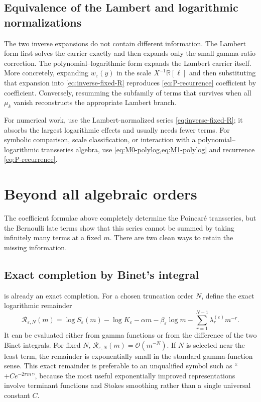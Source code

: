 \documentclass[11pt,a4paper]{article}
\theoremstyle{clean}
\theoremstyle{definition}
\newcommand{\eps}{\varepsilon}
\newcommand{\al}{\alpha}
\newcommand{\be}{\beta}
\newcommand{\OO}{\mathcal O}
\newcommand{\R}{\mathbb R}
\begin{document}
\subsection{Equivalence of the Lambert and logarithmic normalizations}

The two inverse expansions do not contain different information.  The Lambert form first solves the carrier exactly and then expands only the small gamma-ratio correction.  The polynomial--logarithmic form expands the Lambert carrier itself.  More concretely, expanding \(w_\eps(y)\) in the scale \(X^{-1}\R[\ell]\) and then substituting that expansion into \cref{eq:inverse-fixed-R} reproduces \cref{eq:P-recurrence} coefficient by coefficient.  Conversely, resumming the subfamily of terms that survives when all \(\mu_k\) vanish reconstructs the appropriate Lambert branch.

\begin{summarybox}
For numerical work, use the Lambert-normalized series \cref{eq:inverse-fixed-R}; it absorbs the largest logarithmic effects and usually needs fewer terms.  For symbolic comparison, scale classification, or interaction with a polynomial--logarithmic transseries algebra, use \cref{eq:M0-polylog,eq:M1-polylog} and recurrence \cref{eq:P-recurrence}.
\end{summarybox}

\section{Beyond all algebraic orders}
\label{sec:beyond}

The coefficient formulae above completely determine the Poincar\'e transseries, but the Bernoulli late terms show that this series cannot be summed by taking infinitely many terms at a fixed \(m\).  There are two clean ways to retain the missing information.

\subsection{Exact completion by Binet's integral}

 is already an exact completion.  For a chosen truncation order \(N\), define the exact logarithmic remainder
\begin{equation}
 \mathcal R_{\eps,N}(m)=
 \log S_\eps(m)-\log K_\eps-\al m-\be_\eps\log m
 -\sum_{r=1}^{N-1}\lambda_r^{(\eps)}m^{-r}.
 \label{eq:exact-remainder}
\end{equation}
It can be evaluated either from gamma functions or from the difference of the two Binet integrals.  For fixed \(N\), \(\mathcal R_{\eps,N}(m)=\OO(m^{-N})\).  If \(N\) is selected near the least term, the remainder is exponentially small in the standard gamma-function sense.  This exact remainder is preferable to an unqualified symbol such as ``\(+Ce^{-2\pi m}\)'', because the most useful exponentially improved representations involve terminant functions and Stokes smoothing rather than a single universal constant \(C\).
\end{document}
